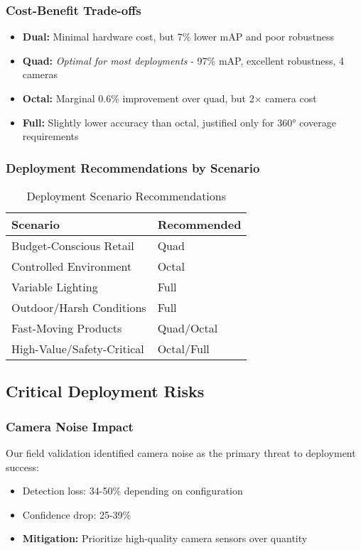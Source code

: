 \documentclass[conference]{IEEEtran}
\begin{document}
\subsubsection{Cost-Benefit Trade-offs}
\begin{itemize}
    \item \textbf{Dual:} Minimal hardware cost, but 7\% lower mAP and poor robustness
    \item \textbf{Quad:} \textit{Optimal for most deployments} - 97\% mAP, excellent robustness, 4 cameras
    \item \textbf{Octal:} Marginal 0.6\% improvement over quad, but 2× camera cost
    \item \textbf{Full:} Slightly lower accuracy than octal, justified only for 360° coverage requirements
\end{itemize}

\subsubsection{Deployment Recommendations by Scenario}
\begin{table}[h]
\centering
\caption{Deployment Scenario Recommendations}
\begin{tabular}{ll}
\toprule
\textbf{Scenario} & \textbf{Recommended} \\
\midrule
Budget-Conscious Retail & Quad \\
Controlled Environment & Octal \\
Variable Lighting & Full \\
Outdoor/Harsh Conditions & Full \\
Fast-Moving Products & Quad/Octal \\
High-Value/Safety-Critical & Octal/Full \\
\bottomrule
\end{tabular}
\end{table}

\subsection{Critical Deployment Risks}

\subsubsection{Camera Noise Impact}
Our field validation identified camera noise as the primary threat to deployment success:
\begin{itemize}
    \item Detection loss: 34-50\% depending on configuration
    \item Confidence drop: 25-39\%
    \item \textbf{Mitigation:} Prioritize high-quality camera sensors over quantity
\end{itemize}
\end{document}
